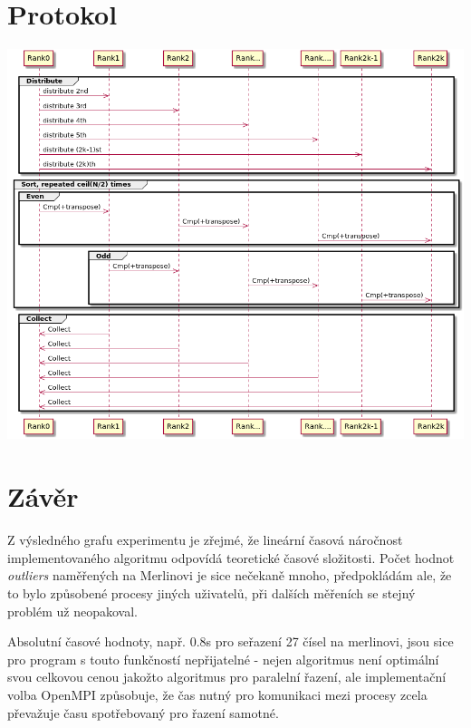 \documentclass[11pt]{article}
\begin{document}
\section{Protokol}
\label{sec:orgf95c3f0}
\begin{center}
\includegraphics[width=.9\linewidth]{odd-even.png}
\end{center}

\section{Závěr}
\label{sec:orgb0e9da6}
Z výsledného grafu experimentu je zřejmé, že lineární časová náročnost
implementovaného algoritmu odpovídá teoretické časové složitosti. Počet hodnot
\emph{outliers} naměřených na Merlinovi je sice nečekaně mnoho, předpokládám ale, že to
bylo způsobené procesy jiných uživatelů, při dalších měřeních se stejný problém
už neopakoval.

Absolutní časové hodnoty, např. 0.8s pro seřazení 27 čísel na merlinovi, jsou
sice pro program s touto funkčností nepřijatelné - nejen algoritmus není
optimální svou celkovou cenou jakožto algoritmus pro paralelní řazení, ale
implementační volba OpenMPI způsobuje, že čas nutný pro komunikaci mezi procesy
zcela převažuje času spotřebovaný pro řazení samotné.
\end{document}
